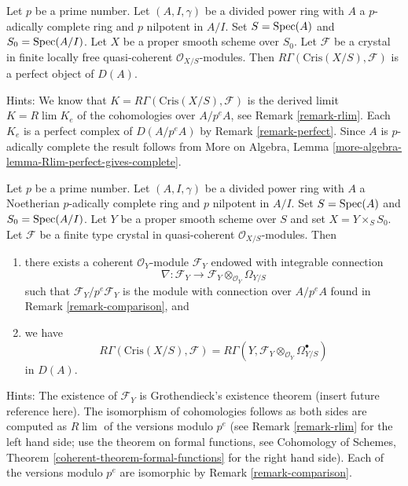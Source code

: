 \begin{remark}
\label{remark-complete-perfect}
Let $p$ be a prime number. Let $(A, I, \gamma)$ be a divided power
ring with $A$ a $p$-adically complete ring and $p$ nilpotent in $A/I$. Set
$S = \mathop{\mathrm{Spec}}(A)$ and $S_0 = \mathop{\mathrm{Spec}}(A/I)$. Let $X$ be a proper
smooth scheme over $S_0$. Let $\mathcal{F}$ be a crystal in
finite locally free quasi-coherent $\mathcal{O}_{X/S}$-modules.
Then $R\Gamma(\text{Cris}(X/S), \mathcal{F})$ is a
perfect object of $D(A)$.

\medskip\noindent
Hints: We know that $K = R\Gamma(\text{Cris}(X/S), \mathcal{F})$
is the derived limit $K = R\lim K_e$ of the cohomologies over $A/p^eA$,
see Remark \ref{remark-rlim}.
Each $K_e$ is a perfect complex of $D(A/p^eA)$ by
Remark \ref{remark-perfect}.
Since $A$ is $p$-adically complete the result
follows from
More on Algebra, Lemma \ref{more-algebra-lemma-Rlim-perfect-gives-complete}.
\end{remark}

\begin{remark}
\label{remark-complete-comparison}
Let $p$ be a prime number. Let $(A, I, \gamma)$ be a divided power
ring with $A$ a Noetherian $p$-adically complete ring and $p$ nilpotent
in $A/I$. Set $S = \mathop{\mathrm{Spec}}(A)$ and
$S_0 = \mathop{\mathrm{Spec}}(A/I)$. Let $Y$ be a proper smooth scheme over $S$ and set
$X = Y \times_S S_0$. Let $\mathcal{F}$ be a finite type crystal in
quasi-coherent $\mathcal{O}_{X/S}$-modules. Then
\begin{enumerate}
\item there exists a coherent $\mathcal{O}_Y$-module $\mathcal{F}_Y$
endowed with integrable connection
$$
\nabla :
\mathcal{F}_Y
\longrightarrow
\mathcal{F}_Y \otimes_{\mathcal{O}_Y} \Omega_{Y/S}
$$
such that $\mathcal{F}_Y/p^e\mathcal{F}_Y$ is the module with connection
over $A/p^eA$ found in Remark \ref{remark-comparison}, and
\item we have
$$
R\Gamma(\text{Cris}(X/S), \mathcal{F}) =
R\Gamma(Y, \mathcal{F}_Y \otimes_{\mathcal{O}_Y} \Omega^\bullet_{Y/S})
$$
in $D(A)$.
\end{enumerate}
Hints: The existence of $\mathcal{F}_Y$ is Grothendieck's existence theorem
(insert future reference here). The isomorphism of cohomologies follows
as both sides are computed as $R\lim$ of the versions modulo $p^e$
(see Remark \ref{remark-rlim} for the left hand side; use the theorem
on formal functions, see
Cohomology of Schemes, Theorem \ref{coherent-theorem-formal-functions}
for the right hand side).
Each of the versions modulo $p^e$ are isomorphic by
Remark \ref{remark-comparison}.
\end{remark}




